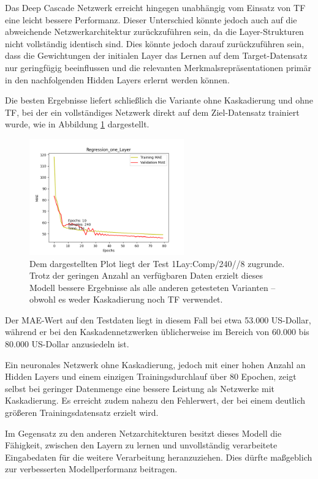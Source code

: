 Das Deep Cascade Netzwerk erreicht hingegen unabhängig vom Einsatz von TF eine leicht bessere Performanz. Dieser Unterschied könnte jedoch auch 
auf die abweichende Netzwerkarchitektur zurückzuführen sein, da die Layer-Strukturen nicht vollständig identisch sind. 
Dies könnte jedoch darauf zurückzuführen sein, dass die Gewichtungen der initialen Layer das Lernen auf dem Target-Datensatz nur geringfügig 
beeinflussen und die relevanten Merkmalsrepräsentationen primär in den nachfolgenden Hidden Layers erlernt werden können.

Die besten Ergebnisse liefert schließlich die Variante ohne Kaskadierung und ohne TF, bei der ein vollständiges Netzwerk direkt 
auf dem Ziel-Datensatz trainiert wurde, wie in Abbildung \ref{fig:smallonlcomp} dargestellt.

\begin{figure}
    \centering
    \includegraphics[height=5cm]{../../Plots/ba_plots/regression_small/onelayer_complete.png}
    \caption{\label{fig:smallonlcomp} 
    \small{Dem dargestellten Plot liegt der Test 1Lay:Comp/240//8 zugrunde. Trotz der geringen Anzahl an verfügbaren Daten erzielt dieses Modell 
    bessere Ergebnisse als alle anderen getesteten Varianten – obwohl es weder Kaskadierung noch TF verwendet.}}
\end{figure}

Der MAE-Wert auf den Testdaten liegt in diesem Fall bei etwa 53.000 US-Dollar, während er bei den Kaskadennetzwerken 
üblicherweise im Bereich von 60.000 bis 80.000 US-Dollar anzusiedeln ist.

Ein neuronales Netzwerk ohne Kaskadierung, jedoch mit einer hohen Anzahl an Hidden Layers und einem einzigen Trainingsdurchlauf über 80 Epochen, 
zeigt selbst bei geringer Datenmenge eine bessere Leistung als Netzwerke mit Kaskadierung. Es erreicht zudem nahezu den Fehlerwert, der bei 
einem deutlich größeren Trainingsdatensatz erzielt wird.

Im Gegensatz zu den anderen Netzarchitekturen besitzt dieses Modell die Fähigkeit, zwischen den Layern zu lernen und unvollständig verarbeitete 
Eingabedaten für die weitere Verarbeitung heranzuziehen. Dies dürfte maßgeblich zur verbesserten Modellperformanz beitragen.

